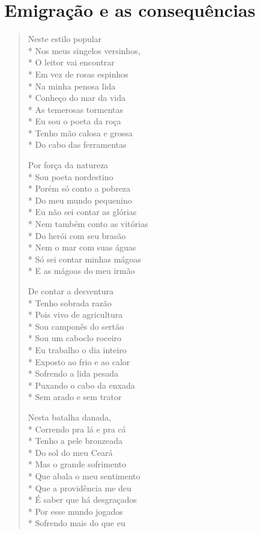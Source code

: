 \chapter{Emigração e as consequências}

\begin{verse}
Neste estilo popular\\*
Nos meus singelos versinhos,\\*
O leitor vai encontrar\\*
Em vez de rosas espinhos\\*
Na minha penosa lida\\*
Conheço do mar da vida\\*
As temerosas tormentas\\*
Eu sou o poeta da roça\\*
Tenho mão calosa e grossa\\*
Do cabo das ferramentas

Por força da natureza\\*
Sou poeta nordestino\\*
Porém só conto a pobreza\\*
Do meu mundo pequenino\\*
Eu não sei contar as glórias\\*
Nem também conto as vitórias\\*
Do herói com seu brasão\\*
Nem o mar com suas águas\\*
Só sei contar minhas mágoas\\*
E as mágoas do meu irmão

De contar a desventura\\*
Tenho sobrada razão\\*
Pois vivo de agricultura\\*
Sou camponês do sertão\\*
Sou um caboclo roceiro\\*
Eu trabalho o dia inteiro\\*
Exposto ao frio e ao calor\\*
Sofrendo a lida pesada\\*
Puxando o cabo da enxada\\*
Sem arado e sem trator

Nesta batalha danada,\\*
Correndo pra lá e pra cá\\*
Tenho a pele bronzeada\\*
Do sol do meu Ceará\\*
Mas o grande sofrimento\\*
Que abala o meu sentimento\\*
Que a providência me deu\\*
É saber que há desgraçados\\*
Por esse mundo jogados\\*
Sofrendo mais do que eu


\end{verse}
